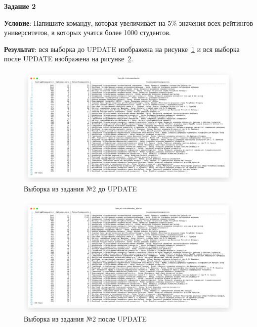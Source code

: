 \newpage

\begin{center}
  \textbf{Задание 2}
\end{center}

\textbf{Условие}:
Напишите команду, которая увеличивает на 5\% значения всех рейтингов университетов,
в которых учатся более 1000 студентов.

\textbf{Результат}: вся выборка до UPDATE изображена на рисунке~\ref{fig:t2_1}
и вся выборка после UPDATE изображена на рисунке~\ref{fig:t2_2}.

\begin{figure}[!h]
  \centering

  \includegraphics[width=18cm]
  {../sql/task2/2-list-universities__before.png}

  \caption{Выборка из задания №2 до UPDATE}

  \label{fig:t2_1}
\end{figure}



\begin{figure}[!h]
  \centering

  \includegraphics[width=18cm]
  {../sql/task2/2-list-universities__after.png}

  \caption{Выборка из задания №2 после UPDATE}

  \label{fig:t2_2}
\end{figure}


